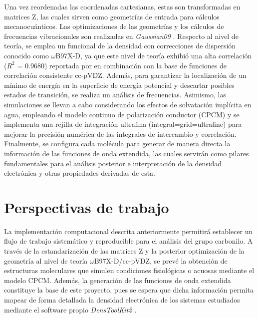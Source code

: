 \documentclass[12pt]{article}
\begin{document}
	
		Una vez reordenadas las coordenadas cartesianas, estas son transformadas en matrices Z, las cuales sirven como geometr\'{i}as de entrada para c\'{a}lculos mecanocu\'{a}nticos. Las optimizaciones de las geometr\'{i}as y los c\'{a}lculos de frecuencias vibracionales son realizadas en \textit{Gaussian09} . Respecto al nivel de teor\'{i}a, se emplea un funcional de la densidad con correcciones de dispersi\'{o}n conocido como $\omega$B97X-D, ya que este nivel de teor\'{i}a exhibi\'{o} una alta correlación ($R^2$ = 0.9680) reportada por \cite{Caballero-Garcia2019} en combinaci\'{o}n con la base de funciones de correlaci\'{o}n consistente cc-pVDZ. Adem\'{a}s, para garantizar la localizaci\'{o}n de un m\'{i}nimo de energ\'{i}a en la superficie de energ\'{i}a potencial y descartar posibles estados de transici\'{o}n, se realiza un an\'{a}lisis de frecuencias. Asimismo, las simulaciones se llevan a cabo considerando los efectos de solvataci\'{o}n impl\'{i}cita en agua, empleando el modelo continuo de polarizaci\'{o}n conductor (CPCM) y se implementa una rejilla de integraci\'{o}n ultrafina (integral=grid=ultrafine) para mejorar la precisi\'{o}n num\'{e}rica de las integrales de intercambio y correlaci\'{o}n. Finalmente, se configura cada mol\'{e}cula para generar de manera directa la informaci\'{o}n de las funciones de onda extendida, las cuales servir\'{a}n como pilares fundamentales para el an\'{a}lisis posterior e interpretaci\'{o}n de la densidad electr\'{o}nica y otras propiedades derivadas de esta.
		
	\clearpage
	
	\section{Perspectivas de trabajo}
	
	La implementaci\'{o}n computacional descrita anteriormente permitir\'{a} establecer un flujo de trabajo sistem\'{a}tico y reproducible para el an\'{a}lisis del grupo carbonilo. A trav\'{e}s de la estandarizaci\'{o}n de las matrices Z y la posterior optimizaci\'{o}n de la geometr\'{i}a al nivel de teor\'{i}a $\omega$B97X-D/cc-pVDZ, se prev\'{e} la obtenci\'{o}n de estructuras moleculares que simulen condiciones fisiol\'{o}gicas o acuosas mediante el modelo CPCM. Adem\'{a}s, la generaci\'{o}n de las funciones de onda extendida constituye la base de este proyecto, pues se espera que dicha informaci\'{o}n permita mapear de forma detallada la densidad electr\'{o}nica de los sistemas estudiados mediante el software propio \textit{DensToolKit2} \cite{Solano2024}.
		
\end{document}
